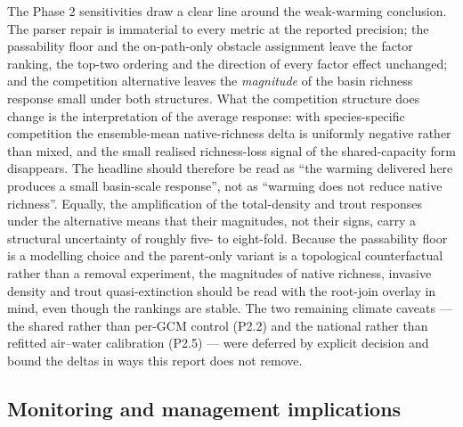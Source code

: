 \documentclass[11pt,a4paper]{article}
\begin{document}
The Phase 2 sensitivities draw a clear line around the weak-warming conclusion. The parser repair is immaterial to every metric at the reported precision; the passability floor and the on-path-only obstacle assignment leave the factor ranking, the top-two ordering and the direction of every factor effect unchanged; and the competition alternative leaves the \emph{magnitude} of the basin richness response small under both structures. What the competition structure does change is the interpretation of the average response: with species-specific competition the ensemble-mean native-richness delta is uniformly negative rather than mixed, and the small realised richness-loss signal of the shared-capacity form disappears. The headline should therefore be read as ``the warming delivered here produces a small basin-scale response'', not as ``warming does not reduce native richness''. Equally, the amplification of the total-density and trout responses under the alternative means that their magnitudes, not their signs, carry a structural uncertainty of roughly five- to eight-fold. Because the passability floor is a modelling choice and the parent-only variant is a topological counterfactual rather than a removal experiment, the magnitudes of native richness, invasive density and trout quasi-extinction should be read with the root-join overlay in mind, even though the rankings are stable. The two remaining climate caveats --- the shared rather than per-GCM control (P2.2) and the national rather than refitted air--water calibration (P2.5) --- were deferred by explicit decision and bound the deltas in ways this report does not remove.

\subsection{Monitoring and management implications}
\end{document}
